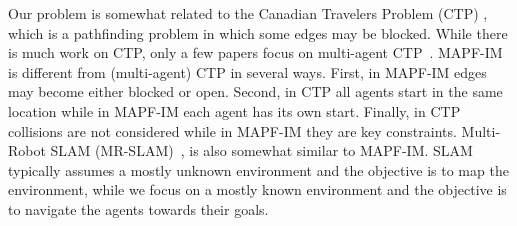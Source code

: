 \documentclass[letterpaper]{article} %
\def\
UrlFont{\rm}  %
\newcommand{\roni}[1]{\textbf{[\color{orange}RONI:#1]}}
\theoremstyle{definition}
\begin{document}
Our problem is somewhat related to the Canadian Travelers Problem (CTP) \cite{zhang2013k}, which is a pathfinding problem in which some edges may be blocked. While there is much work on CTP, only a few papers focus on multi-agent CTP~\cite{shiri2017online,shiri2019randomized}. 
MAPF-IM is different from (multi-agent) CTP in several ways. First, in MAPF-IM edges may become either blocked or open. Second, in CTP all agents start in the same location while in MAPF-IM each agent has its own start. 
Finally, in CTP collisions are not considered while in MAPF-IM they are key constraints. 
Multi-Robot SLAM (MR-SLAM)~\cite{burgard2000collaborative,kshirsagar2018survey,abdulgalil2019multi}, is also somewhat similar to MAPF-IM. SLAM typically assumes a mostly unknown environment and the objective is to map the environment, while we focus on a mostly known environment and the objective is to navigate the agents towards their goals.  
\end{document}
